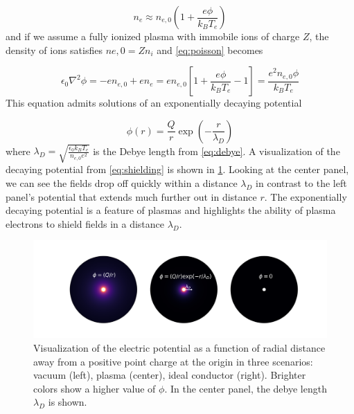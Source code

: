 \begin{equation}
	n_e \approx n_{e,0}(1 + \frac{e \phi}{k_B T_e})
\end{equation} 
and if we assume a fully ionized plasma with immobile ions of charge $Z$, the density of ions satisfies $n{e,0} = Z n_i$ and \cref{eq:poisson} becomes 

\begin{equation}
	\epsilon_0 \nabla^2 \phi = - e n_{e,0} + e n_e = e n_{e,0} [1 + \frac{e \phi}{k_B T_e} - 1] = \frac{e^2 n_{e,0} \phi}{k_B T_e}
\end{equation}
This equation admits solutions of an exponentially decaying potential

\begin{equation}
	\phi(r) = \frac{Q}{r} \exp(-\frac{r}{\lambda_{D}}) \label{eq:shielding}
\end{equation}
where $\lambda_D = \sqrt{\frac{\epsilon_0 k_B T_e}{n_{e,0} e^2}}$ is the Debye length from \cref{eq:debye}. A visualization of the decaying potential from \cref{eq:shielding} is shown in \cref{fig:debye}. Looking at the center panel, we can see the fields drop off quickly within a distance $\lambda_D$ in contrast to the left panel's potential that extends much further out in distance $r$. The exponentially decaying potential is a feature of plasmas and highlights the ability of plasma electrons to shield fields in a distance $\lambda_D$. 

\begin{figure}
	\centering 
	\includegraphics[width=\linewidth]{planning/images/debye_length.png}
	\caption{Visualization of the electric potential as a function of radial distance away from a positive point charge at the origin in three scenarios: vacuum (left), plasma (center), ideal conductor (right). Brighter colors show a higher value of $\phi$. In the center panel, the debye length $\lambda_D$ is shown.}
	\label{fig:debye}
\end{figure}

